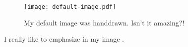 \begin{figure}
	\texttt{[image: default-image.pdf]}
	\caption[My default Image]{My default image was handdrawn. Isn't it
	amazing?!}
	\label{fig:my-default-image}
\end{figure}

I really like to emphasize in my image .
